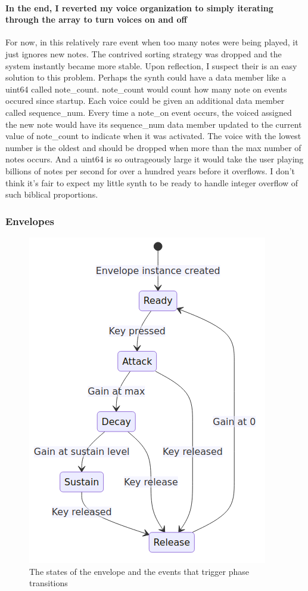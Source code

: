 \documentclass[acmlarge,screen]{acmart}
\begin{document}
	\paragraph{In the end, I reverted my voice organization to simply iterating through the array to turn voices on and off} For now, in this relatively rare event when too many notes were being played, it just ignores new notes. The contrived sorting strategy was dropped and the system instantly became more stable. Upon reflection, I suspect their is an easy solution to this problem. Perhaps the synth could have a data member like a uint64 called note\_count. note\_count would count how many note on events occured since startup. Each voice could be given an additional data member called sequence\_num. Every time a note\_on event occurs, the voiced assigned the new note would have its sequence\_num data member updated to the current value of note\_count to indicate when it was activated. The voice with the lowest number is the oldest and should be dropped when more than the max number of notes occurs. And a uint64 is so outrageously large it would take the user playing billions of notes per second for over a hundred years before it overflows. I don't think it's fair to expect my little synth to be ready to handle integer overflow of such biblical proportions.

	
	\subsubsection{Envelopes}
	
	\begin{figure}
		\centering
		\caption{The states of the envelope and the events that trigger phase transitions}
		\includegraphics[width=.8\linewidth]{envelope_state_diagram}
	\end{figure}
	
\end{document}
